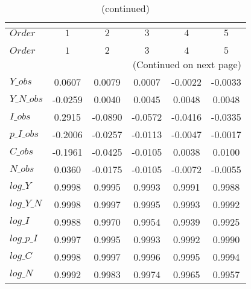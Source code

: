  
\begin{center}
\begin{longtable}{lccccc} 
\caption{COEFFICIENTS OF AUTOCORRELATION}\\
 \label{Table:th_autocorr_matrix}\\
\toprule 
$Order      $	 & 	 $          1$	 & 	 $          2$	 & 	 $          3$	 & 	 $          4$	 & 	 $          5$\\
\midrule \endfirsthead 
\caption{(continued)}\\
 \toprule \\ 
$Order      $	 & 	 $          1$	 & 	 $          2$	 & 	 $          3$	 & 	 $          4$	 & 	 $          5$\\
\midrule \endhead 
\midrule \multicolumn{6}{r}{(Continued on next page)} \\ \bottomrule \endfoot 
\bottomrule \endlastfoot 
$Y\_obs     $	 & 	     0.0607	 & 	     0.0079	 & 	     0.0007	 & 	    -0.0022	 & 	    -0.0033 \\ 
$Y\_N\_obs  $	 & 	    -0.0259	 & 	     0.0040	 & 	     0.0045	 & 	     0.0048	 & 	     0.0048 \\ 
$I\_obs     $	 & 	     0.2915	 & 	    -0.0890	 & 	    -0.0572	 & 	    -0.0416	 & 	    -0.0335 \\ 
$p\_I\_obs  $	 & 	    -0.2006	 & 	    -0.0257	 & 	    -0.0113	 & 	    -0.0047	 & 	    -0.0017 \\ 
$C\_obs     $	 & 	    -0.1961	 & 	    -0.0425	 & 	    -0.0105	 & 	     0.0038	 & 	     0.0100 \\ 
$N\_obs     $	 & 	     0.0360	 & 	    -0.0175	 & 	    -0.0105	 & 	    -0.0072	 & 	    -0.0055 \\ 
$log\_Y     $	 & 	     0.9998	 & 	     0.9995	 & 	     0.9993	 & 	     0.9991	 & 	     0.9988 \\ 
$log\_Y\_N  $	 & 	     0.9998	 & 	     0.9997	 & 	     0.9995	 & 	     0.9993	 & 	     0.9992 \\ 
$log\_I     $	 & 	     0.9988	 & 	     0.9970	 & 	     0.9954	 & 	     0.9939	 & 	     0.9925 \\ 
$log\_p\_I  $	 & 	     0.9997	 & 	     0.9995	 & 	     0.9993	 & 	     0.9992	 & 	     0.9990 \\ 
$log\_C     $	 & 	     0.9998	 & 	     0.9997	 & 	     0.9996	 & 	     0.9995	 & 	     0.9994 \\ 
$log\_N     $	 & 	     0.9992	 & 	     0.9983	 & 	     0.9974	 & 	     0.9965	 & 	     0.9957 \\ 
\end{longtable}
 \end{center}

